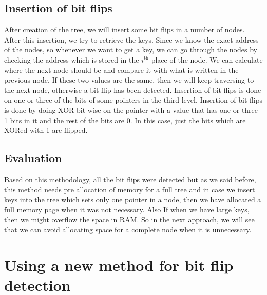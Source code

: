 \documentclass{report}
\begin{document}
\subsection{Insertion of bit flips}

After creation of the tree, we will insert some bit flips in a number of nodes. After this insertion, we try to retrieve the keys. Since we know the exact address of the nodes, so whenever we want to get a key, we can go through the nodes by checking the address which is stored in the $i^{\text{th}}$ place of the node. We can calculate where the next node should be and compare it with what is written in the previous node. If these two values are the same, then we will keep traversing to the next node, otherwise a bit flip has been detected. Insertion of bit flips is done on one or three of the bits of some pointers in the third level. Insertion of bit flips is done by doing XOR bit wise on the pointer with a value that has one or three 1 bits in it and the rest of the bits are 0. In this case, just the bits which are XORed with 1 are flipped.  

\subsection{Evaluation}  

Based on this methodology, all the bit flips were detected but as we said before, this method needs pre allocation of memory for a full tree and in case we insert keys into the tree which sets only one pointer in a node, then we have allocated a full memory page when it was not necessary. Also If when we have large keys, then we might overflow the space in RAM. So in the next approach, we will see that we can avoid allocating space for a complete node when it is unnecessary.
 
\section{Using a new method for bit flip detection }
\end{document}
